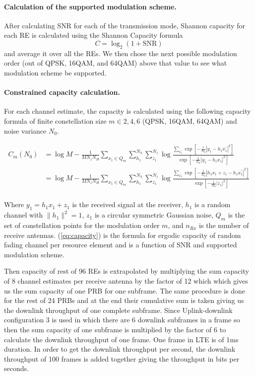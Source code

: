 \documentclass[a4paper,10pt]{article}
\begin{document}
\paragraph{Calculation of the supported modulation scheme.}
After calculating SNR for each of the transmission mode, Shannon capacity for each RE is calculated using the Shannon Capacity formula $$C = \log_2(1 + \mathrm{SNR})$$ and average it over all the REs. We then chose the next possible modulation order (out of QPSK, 16QAM, and 64QAM) above that value  to see what modulation scheme be supported. 

\paragraph{Constrained capacity calculation.}
For each channel estimate, the capacity is calculated using the following capacity formula of finite constellation size $m \in {2,4,6}$ (QPSK, 16QAM, 64QAM) and noise variance $N_0$.

\begin{align}
C_m\left(N_0\right)
&=\log M-\frac{1}{MN_{z}N_{H}}\sum_{x_{1}\in{Q_m}}\sum_{h_1}^{N_{h}}\sum_{z_{1}}^{N_{z}}\log\frac{\sum_{x^{'}_{1}}\exp\left[-\frac{1}{N_{0}}\left|y_{1}-h_{1}x^{'}_{1}\right|^2\right]}{\exp\left[-\frac{1}{N_{0}}\left|y_{1}-h_{1}x_{1}\right|^{2}\right]}\nonumber\\
&=\log M-\frac{1}{MN_{z}N_{H}}\sum_{x_{1}\in{Q_m}}\sum_{h_1}^{N_{h}}\sum_{z_{1}}^{N_{z}}\log\frac{\sum_{x^{'}_{1}}\exp\left[-\frac{1}{N_{0}}\left|h_{1}x_{1} + z_1 - h_1x^{'}_{1}\right|^2\right]}{\exp\left[-\frac{1}{N_{0}}\left|z_{1}\right|^{2}\right]}\nonumber\\
\label{eq:capacity}
\end{align}

Where $y_1 = h_1x_1 + z_1$ is the received signal at the receiver, $h_1$ is a random channel with $\|h_1\|^2=1$, $z_1$ is a circular symmetric Gaussian noise, $Q_m$ is the set of constellation points for the modulation order $m$, and $n_{Rx}$ is the number of receive antennas. (\ref{eq:capacity}) is the formula for ergodic capacity of random fading channel per resource element and is a function of SNR and supported modulation scheme. 


Then capacity of rest of 96 REs is extrapolated by multiplying the sum capacity of 8 channel estimates per receive antenna by the factor of 12 which which gives us the sum capacity of one PRB for one subframe. The same procedure is done for the rest of 24 PRBs and at the end their cumulative sum is taken giving us the downlink throughput of one complete subframe. Since Uplink-downlink configuration 3 is used in which there are 6 downlink subframes in a frame so then the sum capacity of one subframe is multiplied by the factor of 6 to calculate the downlink throughput of one frame. One frame in LTE is of 1ms duration. In order to get the downlink throughput per second, the downlink throughput of 100 frames is added together giving the throughput in bits per seconds.
\end{document}
